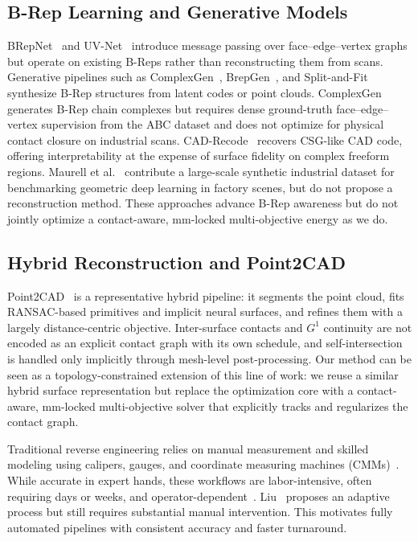 \documentclass{ieeeaccess}
\begin{document}
\subsection{B-Rep Learning and Generative Models}
BRepNet~\cite{b3} and UV-Net~\cite{b9} introduce message passing over face--edge--vertex graphs but operate on existing B-Reps rather than reconstructing them from scans. Generative pipelines such as ComplexGen~\cite{b1}, BrepGen~\cite{b4}, and Split-and-Fit~\cite{b20} synthesize B-Rep structures from latent codes or point clouds. ComplexGen~\cite{b1} generates B-Rep chain complexes but requires dense ground-truth face--edge--vertex supervision from the ABC dataset and does not optimize for physical contact closure on industrial scans. CAD-Recode~\cite{b24} recovers CSG-like CAD code, offering interpretability at the expense of surface fidelity on complex freeform regions. Maurell et al.~\cite{b31} contribute a large-scale synthetic industrial dataset for benchmarking geometric deep learning in factory scenes, but do not propose a reconstruction method. These approaches advance B-Rep awareness but do not jointly optimize a contact-aware, mm-locked multi-objective energy as we do.

\subsection{Hybrid Reconstruction and Point2CAD}
Point2CAD~\cite{b2} is a representative hybrid pipeline: it segments the point cloud, fits RANSAC-based primitives and implicit neural surfaces, and refines them with a largely distance-centric objective. Inter-surface contacts and $G^1$ continuity are not encoded as an explicit contact graph with its own schedule, and self-intersection is handled only implicitly through mesh-level post-processing. Our method can be seen as a topology-constrained extension of this line of work: we reuse a similar hybrid surface representation but replace the optimization core with a contact-aware, mm-locked multi-objective solver that explicitly tracks and regularizes the contact graph.

Traditional reverse engineering relies on manual measurement and skilled modeling using calipers, gauges, and coordinate measuring machines (CMMs)~\cite{b16,b25}. While accurate in expert hands, these workflows are labor-intensive, often requiring days or weeks, and operator-dependent~\cite{b16}. Liu~\cite{b16} proposes an adaptive process but still requires substantial manual intervention. This motivates fully automated pipelines with consistent accuracy and faster turnaround.
\end{document}
